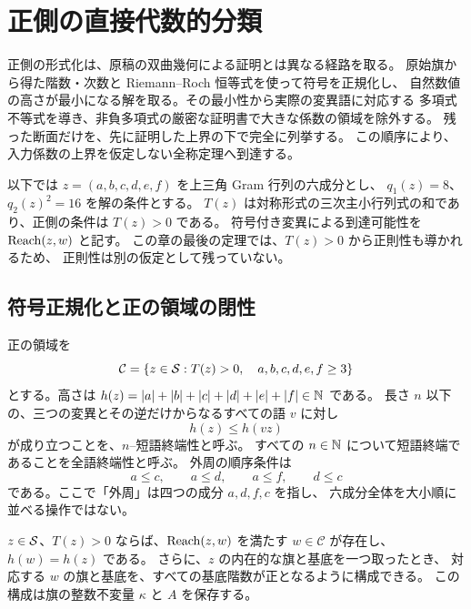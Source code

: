 \section{正側の直接代数的分類}

正側の形式化は、原稿の双曲幾何による証明とは異なる経路を取る。
原始旗から得た階数・次数と Riemann--Roch 恒等式を使って符号を正規化し、
自然数値の高さが最小になる解を取る。その最小性から実際の変異語に対応する
多項式不等式を導き、非負多項式の厳密な証明書で大きな係数の領域を除外する。
残った断面だけを、先に証明した上界の下で完全に列挙する。
この順序により、入力係数の上界を仮定しない全称定理へ到達する。

以下では $z=(a,b,c,d,e,f)$ を上三角 Gram 行列の六成分とし、
$q_1(z)=8$、$q_2(z)^2=16$ を解の条件とする。
$T(z)$ は対称形式の三次主小行列式の和であり、正側の条件は $T(z)>0$ である。
符号付き変異による到達可能性を $\operatorname{Reach}(z,w)$ と記す。
この章の最後の定理では、$T(z)>0$ から正則性も導かれるため、
正則性は別の仮定として残っていない。

\subsection{符号正規化と正の領域の閉性}

\begin{definition}
\label{bp:pos-chamber}
\leanok
正の領域を
\[
 \mathcal C=\{z\in\mathcal S:T(z)>0,\quad a,b,c,d,e,f\geq3\}
\]
とする。高さは $h(z)=|a|+|b|+|c|+|d|+|e|+|f|\in\mathbb N$ である。
長さ $n$ 以下の、三つの変異とその逆だけからなるすべての語 $v$ に対し
\[
 h(z)\leq h(vz)
\]
が成り立つことを、$n$--短語終端性と呼ぶ。
すべての $n\in\mathbb N$ について短語終端であることを全語終端性と呼ぶ。
外周の順序条件は
\[
 a\leq c,\qquad a\leq d,\qquad a\leq f,\qquad d\leq c
 \tag{O}
\]
である。ここで「外周」は四つの成分 $a,d,f,c$ を指し、
六成分全体を大小順に並べる操作ではない。
\end{definition}

\begin{proposition}[原始階数に沿う符号正規化]
\label{bp:pos-normalization}
\leanok
$z\in\mathcal S$、$T(z)>0$ ならば、$\operatorname{Reach}(z,w)$ を満たす $w\in\mathcal C$ が存在し、
$h(w)=h(z)$ である。
さらに、$z$ の内在的な旗と基底を一つ取ったとき、
対応する $w$ の旗と基底を、すべての基底階数が正となるように構成できる。
この構成は旗の整数不変量 $\kappa$ と $A$ を保存する。
\end{proposition}

